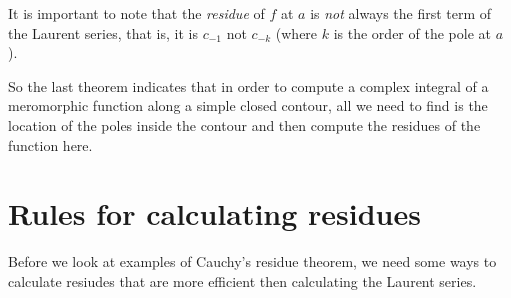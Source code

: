 
It is important to note that the \emph{residue} of $f$ at $a$
is \emph{not} always the first term of the Laurent series, that is, it is $c_{-1}$
not $c_{-k}$ (where $k$ is the order of the pole at $a$).

So the last theorem indicates that in order to compute a complex integral of
a meromorphic function along a simple closed contour, all we need to find is the
location of the poles inside the contour and then compute the residues of the function here.

\section{Rules for calculating residues}

Before we look at examples of Cauchy's residue theorem, we need
some ways to calculate resiudes that are more efficient then calculating
the Laurent series.

